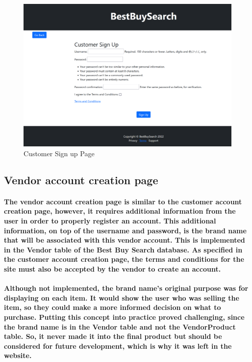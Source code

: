 \documentclass[sigconf]{acmart}
\begin{document}
\begin{figure}[H]
    \centering
    \includegraphics[scale=0.2]{CustomerSignup.PNG}
    \caption{Customer Sign up Page}
    \label{fig:my_label}
\end{figure}

\subsection{Vendor account creation page}

\paragraph{The vendor account creation page is similar to the customer account creation page, however, it requires additional information from the user in order to properly register an account. This additional information, on top of the username and password, is the brand name that will be associated with this vendor account. This is implemented in the Vendor table of the Best Buy Search database. As specified in the customer account creation page, the terms and conditions for the site must also be accepted by the vendor to create an account. }

\paragraph{Although not implemented, the brand name's original purpose was for displaying on each item. It would show the user who was selling the item, so they could make a more informed decision on what to purchase. Putting this concept into practice proved challenging, since the brand name is in the Vendor table and not the VendorProduct table. So, it never made it into the final product but should be considered for future development, which is why it was left in the website. }
\end{document}
